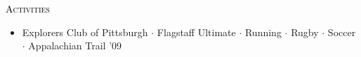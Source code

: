 \begin{minipage}{\firstWidth}
\large \textcolor{Black}{\textsc{Activities}}
\end{minipage}
\begin{minipage}{\secondWidth}
    \begin{itemize}
    \item{\small 
    Explorers Club of Pittsburgh $\cdot$
    Flagstaff Ultimate $\cdot$
    Running $\cdot$
    Rugby $\cdot$ 
    Soccer $\cdot$
    Appalachian Trail '09} 
    \end{itemize}
\end{minipage}
